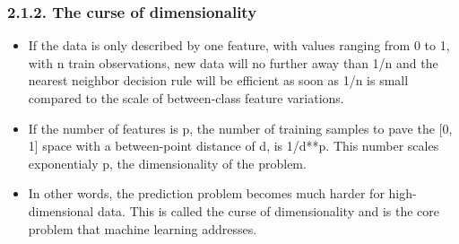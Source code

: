 \subsubsection{2.1.2. The curse of dimensionality}
\begin{itemize}
\item If the data is only described by one feature, with values ranging from 0 to 1, with n train observations, new data will no further away than 1/n and the nearest neighbor decision rule will be efficient as soon as 1/n is small compared to the scale of between-class feature variations.

\item If the number of features is p, the number of training samples to pave the [0, 1] space with a between-point distance of d, is 1/d**p. This number scales exponentialy p, the dimensionality of the problem.

\item In other words, the prediction problem becomes much harder for high-dimensional data. This is called the curse of dimensionality and is the core problem that machine learning addresses.

\end{itemize}



